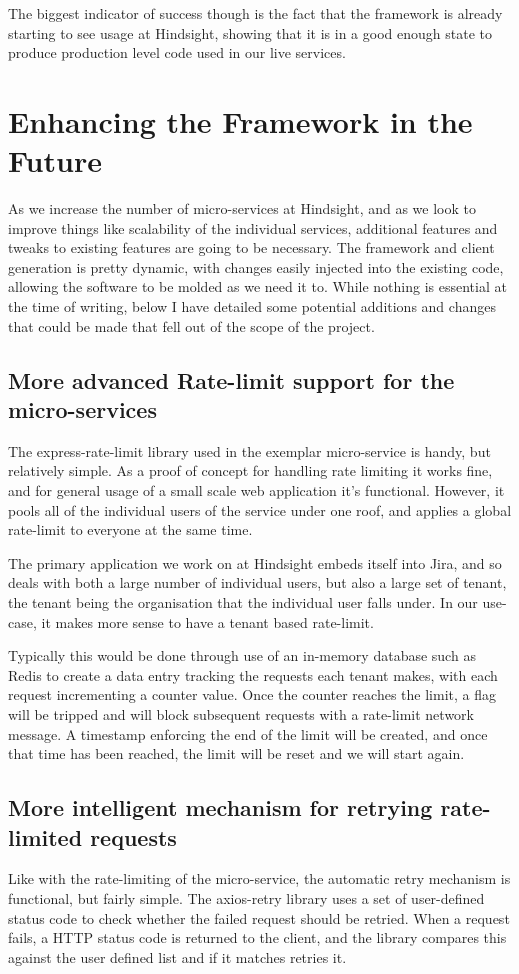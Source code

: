 The biggest indicator of success though is the fact that the framework is already starting to see usage at Hindsight, showing that it is in a good enough state to produce production level code used in our live services.

\section{Enhancing the Framework in the Future}
As we increase the number of micro-services at Hindsight, and as we look to improve things like scalability of the individual services, additional features and tweaks to existing features are going to be necessary. The framework and client generation is pretty dynamic, with changes easily injected into the existing code, allowing the software to be molded as we need it to. While nothing is essential at the time of writing, below I have detailed some potential additions and changes that could be made that fell out of the scope of the project.
\subsection{More advanced Rate-limit support for the micro-services}
The express-rate-limit library used in the exemplar micro-service is handy, but relatively simple. As a proof of concept for handling rate limiting it works fine, and for general usage of a small scale web application it's functional. However, it pools all of the individual users of the service under one roof, and applies a global rate-limit to everyone at the same time.

The primary application we work on at Hindsight embeds itself into Jira, and so deals with both a large number of individual users, but also a large set of tenant, the tenant being the organisation that the individual user falls under. In our use-case, it makes more sense to have a tenant based rate-limit.

Typically this would be done through use of an in-memory database such as Redis to create a data entry tracking the requests each tenant makes, with each request incrementing a counter value. Once the counter reaches the limit, a flag will be tripped and will block subsequent requests with a rate-limit network message. A timestamp enforcing the end of the limit will be created, and once that time has been reached, the limit will be reset and we will start again.
\subsection{More intelligent mechanism for retrying rate-limited requests}
Like with the rate-limiting of the micro-service, the automatic retry mechanism is functional, but fairly simple. The axios-retry library uses a set of user-defined status code to check whether the failed request should be retried. When a request fails, a HTTP status code is returned to the client, and the library compares this against the user defined list and if it matches retries it. 

